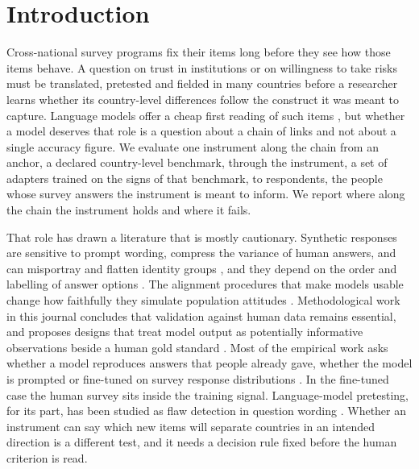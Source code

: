 \section{Introduction}\label{sec:introduction}

Cross-national survey programs fix their items long before they see how those items behave. A question on trust in institutions or on willingness to take risks must be translated, pretested and fielded in many countries before a researcher learns whether its country-level differences follow the construct it was meant to capture. Language models offer a cheap first reading of such items \citep{argyle2023,horton2023,buskirk2026}, but whether a model deserves that role is a question about a chain of links and not about a single accuracy figure. We evaluate one instrument along the chain from an anchor, a declared country-level benchmark, through the instrument, a set of adapters trained on the signs of that benchmark, to respondents, the people whose survey answers the instrument is meant to inform. We report where along the chain the instrument holds and where it fails.

That role has drawn a literature that is mostly cautionary. Synthetic responses are sensitive to prompt wording, compress the variance of human answers, and can misportray and flatten identity groups \citep{bisbee2024,boelaert2025,wang2025}, and they depend on the order and labelling of answer options \citep{dominguezolmedo2024}. The alignment procedures that make models usable change how faithfully they simulate population attitudes \citep{lyman2025}. Methodological work in this journal concludes that validation against human data remains essential, and proposes designs that treat model output as potentially informative observations beside a human gold standard \citep{kozlowski2025,broska2025}. Most of the empirical work asks whether a model reproduces answers that people already gave, whether the model is prompted \citep{santurkar2023,durmus2024} or fine-tuned on survey response distributions \citep{cao2025,suh2025}. In the fine-tuned case the human survey sits inside the training signal. Language-model pretesting, for its part, has been studied as flaw detection in question wording \citep{sturgis2026}. Whether an instrument can say which new items will separate countries in an intended direction is a different test, and it needs a decision rule fixed before the human criterion is read.

